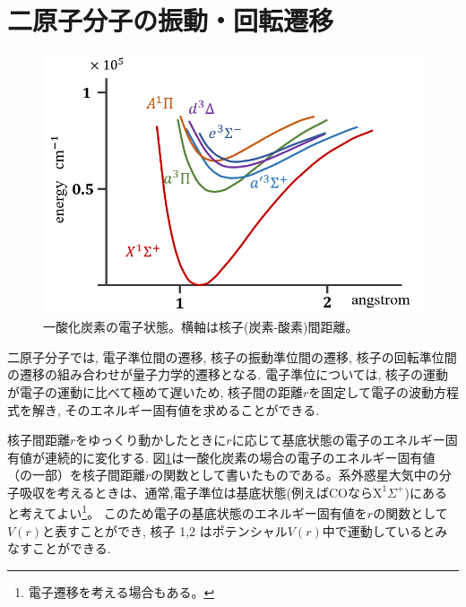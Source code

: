 

\section{二原子分子の振動・回転遷移}
\begin{figure}[]
 \begin{center}
	\includegraphics[width=1.0\linewidth]{fig/co_ele_state.png}
\end{center}
	\caption{一酸化炭素の電子状態。横軸は核子(炭素-酸素)間距離。}
	\label{fig:co_ele_state}
\end{figure} 

二原子分子では, 電子準位間の遷移, 核子の振動準位間の遷移, 核子の回転準位間の遷移の組み合わせが量子力学的遷移となる. 電子準位については, 核子の運動が電子の運動に比べて極めて遅いため, 核子間の距離$r$を固定して電子の波動方程式を解き, そのエネルギー固有値を求めることができる. 

核子間距離$r$をゆっくり動かしたときに$r$に応じて基底状態の電子のエネルギー固有値が連続的に変化する. 図\ref{fig:co_ele_state}は一酸化炭素の場合の電子のエネルギー固有値（の一部）を核子間距離$r$の関数として書いたものである。系外惑星大気中の分子吸収を考えるときは、通常,電子準位は基底状態(例えばCOなら$\mathrm{X^1} \Sigma^+$)にあると考えてよい\footnote{電子遷移を考える場合もある。}。 このため電子の基底状態のエネルギー固有値を$r$の関数として$V(r)$と表すことができ, 核子 1,2 はポテンシャル$V(r)$中で運動しているとみなすことができる. 

